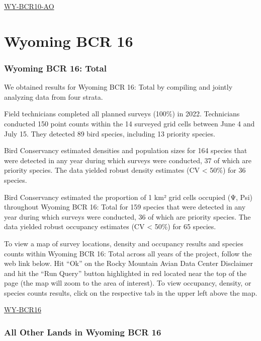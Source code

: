 \documentclass[
  letterpaper,
  DIV=11,
  numbers=noendperiod,
  oneside]{scrreprt}
\begin{document}
\href{http://www.rmbo.org/new_site/adc/QueryWindow.aspx\#N4IgzgLgTghhCuBbEAuABCA6gTQLQCEBhAJQEYAGXAQQHl0qAbBtGiACwFMo0AZGAOwAmYEAF8gA}{WY-BCR10-AO}

\hypertarget{wyoming-bcr-16}{%
\section{Wyoming BCR 16}\label{wyoming-bcr-16}}

\hypertarget{wyoming-bcr-16-total}{%
\subsubsection{Wyoming BCR 16: Total}\label{wyoming-bcr-16-total}}

We obtained results for Wyoming BCR 16: Total by compiling and jointly
analyzing data from four strata.

Field technicians completed all planned surveys (100\%) in 2022.
Technicians conducted 150 point counts within the 14 surveyed grid cells
between June 4 and July 15. They detected 89 bird species, including 13
priority species.

Bird Conservancy estimated densities and population sizes for 164
species that were detected in any year during which surveys were
conducted, 37 of which are priority species. The data yielded robust
density estimates (CV \textless{} 50\%) for 36 species.

Bird Conservancy estimated the proportion of 1 km² grid cells occupied
(Ψ, Psi) throughout Wyoming BCR 16: Total for 159 species that were
detected in any year during which surveys were conducted, 36 of which
are priority species. The data yielded robust occupancy estimates (CV
\textless{} 50\%) for 65 species.

To view a map of survey locations, density and occupancy results and
species counts within Wyoming BCR 16: Total across all years of the
project, follow the web link below. Hit ``Ok'' on the Rocky Mountain
Avian Data Center Disclaimer and hit the ``Run Query'' button
highlighted in red located near the top of the page (the map will zoom
to the area of interest). To view occupancy, density, or species counts
results, click on the respective tab in the upper left above the map.

\href{http://www.rmbo.org/new_site/adc/QueryWindow.aspx\#N4IgzgrgDgpgTmALnAhoiBbEAuABCAdQE0BaAIQGEAlARgDYQBfIA===}{WY-BCR16}

\hypertarget{all-other-lands-in-wyoming-bcr-16}{%
\subsubsection{All Other Lands in Wyoming BCR
16}\label{all-other-lands-in-wyoming-bcr-16}}
\end{document}
